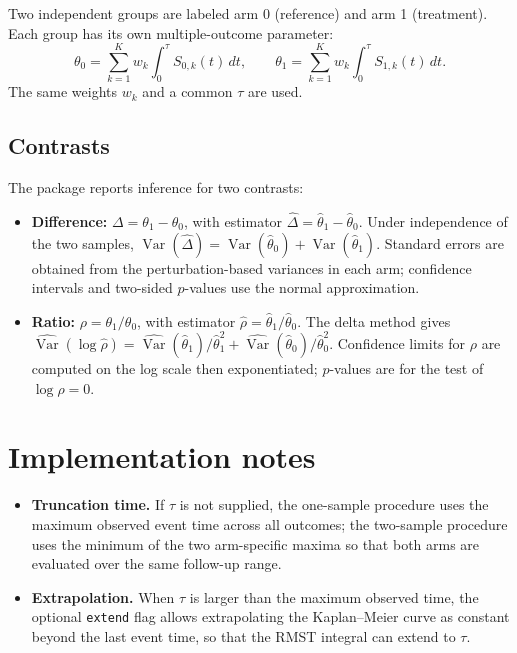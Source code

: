 \documentclass[11pt]{article}
\begin{document}
Two independent groups are labeled arm 0 (reference) and arm 1 (treatment). Each group has its own multiple-outcome parameter:
\begin{equation}
  \theta_0 = \sum_{k=1}^K w_k \int_0^{\tau} S_{0,k}(t)\,dt, \qquad
  \theta_1 = \sum_{k=1}^K w_k \int_0^{\tau} S_{1,k}(t)\,dt.
\end{equation}
The same weights $w_k$ and a common $\tau$ are used.

\subsection{Contrasts}

The package reports inference for two contrasts:
\begin{itemize}
  \item \textbf{Difference:} $\Delta = \theta_1 - \theta_0$, with estimator $\widehat{\Delta} = \widehat{\theta}_1 - \widehat{\theta}_0$. Under independence of the two samples, $\operatorname{Var}(\widehat{\Delta}) = \operatorname{Var}(\widehat{\theta}_0) + \operatorname{Var}(\widehat{\theta}_1)$. Standard errors are obtained from the perturbation-based variances in each arm; confidence intervals and two-sided $p$-values use the normal approximation.
  \item \textbf{Ratio:} $\rho = \theta_1 / \theta_0$, with estimator $\widehat{\rho} = \widehat{\theta}_1 / \widehat{\theta}_0$. The delta method gives $\widehat{\operatorname{Var}}(\log \widehat{\rho}) = \widehat{\operatorname{Var}}(\widehat{\theta}_1)/\widehat{\theta}_1^2 + \widehat{\operatorname{Var}}(\widehat{\theta}_0)/\widehat{\theta}_0^2$. Confidence limits for $\rho$ are computed on the log scale then exponentiated; $p$-values are for the test of $\log \rho = 0$.
\end{itemize}

\section{Implementation notes}

\begin{itemize}
  \item \textbf{Truncation time.} If $\tau$ is not supplied, the one-sample procedure uses the maximum observed event time across all outcomes; the two-sample procedure uses the minimum of the two arm-specific maxima so that both arms are evaluated over the same follow-up range.
  \item \textbf{Extrapolation.} When $\tau$ is larger than the maximum observed time, the optional \texttt{extend} flag allows extrapolating the Kaplan--Meier curve as constant beyond the last event time, so that the RMST integral can extend to $\tau$.
\end{itemize}
\end{document}
